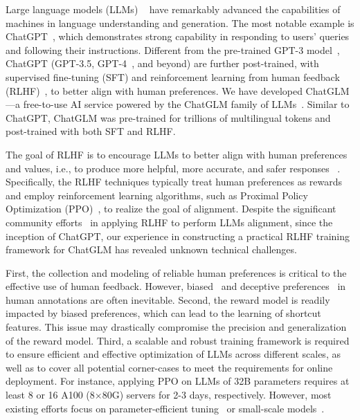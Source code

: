 Large language models (LLMs) ~\cite{brown2020language,zhang2022opt,workshop2022bloom,zeng2023glm,touvron2023llama} have remarkably advanced the capabilities of machines in language understanding and generation. 
The most notable example is ChatGPT~\cite{achiam2023gpt}, which demonstrates strong capability in responding to users' queries and following their instructions.
Different from the pre-trained GPT-3 model~\cite{brown2020language}, ChatGPT (GPT-3.5, GPT-4~\cite{achiam2023gpt}, and beyond) are further post-trained, with supervised fine-tuning (SFT) and reinforcement learning from human feedback (RLHF)~\cite{ouyang2022training}, to better align with human preferences.    
We have developed ChatGLM
---a free-to-use AI service powered by the ChatGLM family of LLMs~\cite{zeng2023glm}. 
Similar to ChatGPT, ChatGLM was pre-trained for trillions of multilingual tokens and post-trained with both SFT and RLHF. 

The goal of RLHF is to 
encourage LLMs to better align with human preferences and values, i.e., to produce more helpful, more accurate, and safer responses ~\cite{bai2022constitutional,achiam2023gpt,ouyang2022training}. 
Specifically, the RLHF techniques typically treat human preferences as rewards and employ reinforcement learning algorithms, such as Proximal Policy Optimization (PPO)~\cite{schulman2017proximal}, to realize the goal of alignment. 
Despite the significant community efforts~\cite{touvron2023llama,bai2023qwen,dai2023safe,sun2023salmon} in applying RLHF to perform LLMs alignment, since the inception of ChatGPT, our experience in constructing a practical RLHF training framework for ChatGLM has revealed unknown technical challenges.

First, the collection and modeling of reliable human preferences is critical to the effective use of human feedback. 
However, biased~\cite{cui2023ultrafeedback,longpre2023flan} and deceptive preferences~\cite{bai2022training} in human annotations are often inevitable.
Second, the reward model is readily impacted by biased preferences, which can lead to the learning of shortcut features. 
This issue may drastically compromise the precision and generalization of the reward model.
Third, a scalable and robust training framework is required to ensure efficient and effective optimization of LLMs across different scales, as well as to cover all potential corner-cases to meet the requirements for online deployment. 
For instance, applying PPO on LLMs of 32B parameters requires at least 8 or 16 A100 (8$\times$80G) servers for 2-3 days, respectively. 
However, most existing efforts focus on parameter-efficient tuning~\cite{sun2023salmon,yao2023deepspeed} or small-scale models~\cite{zheng2023secrets,wu2023pairwise}. 

